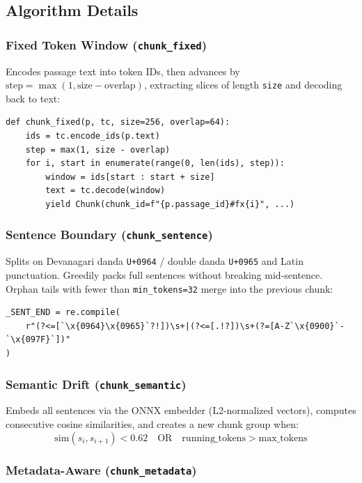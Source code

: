 \documentclass[12pt,a4paper]{article}
\begin{document}
\subsection{Algorithm Details}

\subsubsection{Fixed Token Window (\texttt{chunk\_fixed})}

Encodes passage text into token IDs, then advances by $\text{step} = \max(1, \text{size} - \text{overlap})$, extracting slices of length \texttt{size} and decoding back to text:

\begin{lstlisting}
def chunk_fixed(p, tc, size=256, overlap=64):
    ids = tc.encode_ids(p.text)
    step = max(1, size - overlap)
    for i, start in enumerate(range(0, len(ids), step)):
        window = ids[start : start + size]
        text = tc.decode(window)
        yield Chunk(chunk_id=f"{p.passage_id}#fx{i}", ...)
\end{lstlisting}

\subsubsection{Sentence Boundary (\texttt{chunk\_sentence})}

Splits on Devanagari danda \texttt{U+0964} / double danda \texttt{U+0965} and Latin punctuation. Greedily packs full sentences without breaking mid-sentence. Orphan tails with fewer than \texttt{min\_tokens=32} merge into the previous chunk:

\begin{lstlisting}
_SENT_END = re.compile(
    r"(?<=[`\x{0964}\x{0965}`?!])\s+|(?<=[.!?])\s+(?=[A-Z`\x{0900}`-`\x{097F}`])"
)
\end{lstlisting}

\subsubsection{Semantic Drift (\texttt{chunk\_semantic})}

Embeds all sentences via the ONNX embedder (L2-normalized vectors), computes consecutive cosine similarities, and creates a new chunk group when:
$$\text{sim}(s_i, s_{i+1}) < 0.62 \quad \text{OR} \quad \text{running\_tokens} > \text{max\_tokens}$$

\subsubsection{Metadata-Aware (\texttt{chunk\_metadata})}
\end{document}
